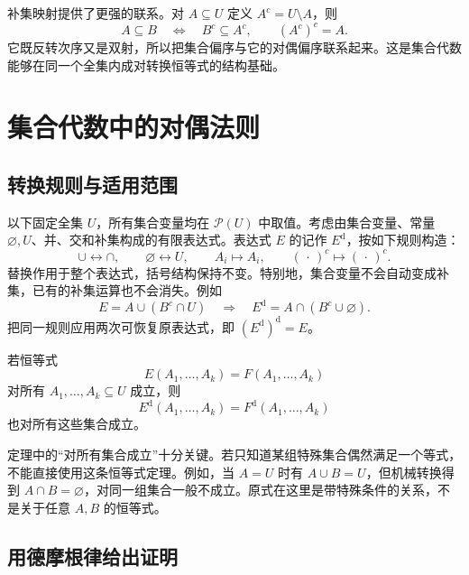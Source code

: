 \documentclass[UTF8]{ctexart}
\begin{document}
补集映射提供了更强的联系。对 $A\subseteq U$ 定义 $A^c=U\setminus A$，则
\begin{equation}
 A\subseteq B\quad\Longleftrightarrow\quad B^c\subseteq A^c,
 \qquad (A^c)^c=A.
 \label{eq:duality-complement-order}
\end{equation}
它既反转次序又是双射，所以把集合偏序与它的对偶偏序联系起来。这是集合代数能够在同一个全集内成对转换恒等式的结构基础。

\section{集合代数中的对偶法则}
\label{sec:duality-sets}

\subsection{转换规则与适用范围}

以下固定全集 $U$，所有集合变量均在 $\mathcal P(U)$ 中取值。考虑由集合变量、常量 $\varnothing,U$、并、交和补集构成的有限表达式。表达式 $E$ 的记作 $E^{\mathrm d}$，按如下规则构造：
\begin{equation}
 \cup\longleftrightarrow\cap,
 \qquad \varnothing\longleftrightarrow U,
 \qquad A_i\longmapsto A_i,
 \qquad (\,\cdot\,)^c\longmapsto (\,\cdot\,)^c.
 \label{eq:duality-set-rule}
\end{equation}
替换作用于整个表达式，括号结构保持不变。特别地，集合变量不会自动变成补集，已有的补集运算也不会消失。例如
\[
 E=A\cup(B^c\cap U)
 \quad\Longrightarrow\quad
 E^{\mathrm d}=A\cap(B^c\cup\varnothing).
\]
把同一规则应用两次可恢复原表达式，即 $(E^{\mathrm d})^{\mathrm d}=E$。

\begin{theorem}[集合恒等式的对偶法则]
\label{thm:duality-set-identity}
若恒等式
\[
 E(A_1,\ldots,A_k)=F(A_1,\ldots,A_k)
\]
对所有 $A_1,\ldots,A_k\subseteq U$ 成立，则
\[
 E^{\mathrm d}(A_1,\ldots,A_k)=F^{\mathrm d}(A_1,\ldots,A_k)
\]
也对所有这些集合成立。
\end{theorem}

定理中的“对所有集合成立”十分关键。若只知道某组特殊集合偶然满足一个等式，不能直接使用这条恒等式定理。例如，当 $A=U$ 时有 $A\cup B=U$，但机械转换得到 $A\cap B=\varnothing$，对同一组集合一般不成立。原式在这里是带特殊条件的关系，不是关于任意 $A,B$ 的恒等式。

\subsection{用德摩根律给出证明}
\end{document}
